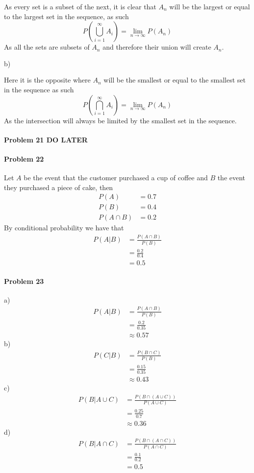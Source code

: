 As every set is a subset of the next, it is clear that $A_n$ will be the largest or equal to the largest set in the sequence, as such
\[
    P\left(\bigcup_{i=1}^{\infty}A_i\right)=\lim_{n\rightarrow \infty}P(A_n)
\]
As all the sets are subsets of $A_n$ and therefore their union will create $A_n$.

b)

Here it is the opposite where $A_n$ will be the smallest or equal to the smallest set in the sequence as such
\[
    P\left(\bigcap_{i=1}^{\infty} A_i\right)=\lim_{n\rightarrow\infty} P(A_n)
\]
As the intersection will always be limited by the smallest set in the sequence.

\paragraph{Problem 21 DO LATER}
\paragraph{Problem 22}
Let $A$ be the event that the customer purchased a cup of coffee and $B$ the event they purchased a piece of cake, then
\begin{align*}
    P(A)&=0.7 \\
    P(B)&=0.4 \\
    P(A\cap B)&=0.2
\end{align*}
By conditional probability we have that
\begin{align*}
    P(A|B)&=\frac{P(A\cap B)}{P(B)} \\
          &=\frac{0.2}{0.4} \\
          &=0.5
\end{align*}
\paragraph{Problem 23}
a)
\begin{align*}
    P(A|B)&=\frac{P(A\cap B)}{P(B)} \\
          &=\frac{0.2}{0.35} \\
          &\approx 0.57
\end{align*}
b)
\begin{align*}
    P(C|B)&=\frac{P(B\cap C)}{P(B)} \\
          &=\frac{0.15}{0.35} \\
          &\approx0.43
\end{align*}
c)
\begin{align*}
    P(B|A\cup C)&=\frac{P(B\cap(A\cup C))}{P(A\cup C)} \\
          &=\frac{0.25}{0.7} \\
          &\approx 0.36
\end{align*}
d)
\begin{align*}
    P(B|A\cap C)&=\frac{P(B\cap(A\cap C))}{P(A\cap C)} \\
          &=\frac{0.1}{0.2} \\
          &=0.5
\end{align*}
